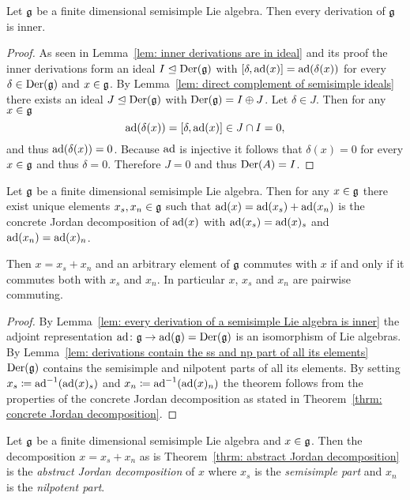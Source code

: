 \begin{lem}\label{lem: every derivation of a semisimple Lie algebra is inner}
 Let $\mathfrak{g}$ be a finite dimensional semisimple Lie algebra. Then every derivation of $\mathfrak{g}$ is inner.
\end{lem}
\begin{proof}
 As seen in Lemma~\ref{lem: inner derivations are in ideal} and its proof the inner derivations form an ideal $I \trianglelefteq \operatorname{Der}(\mathfrak{g})$ with $[\delta,\operatorname{ad}(x)] = \operatorname{ad}(\delta(x))$ for every $\delta \in \operatorname{Der}(\mathfrak{g})$ and $x \in \mathfrak{g}$. By Lemma~\ref{lem: direct complement of semisimple ideals} there exists an ideal $J \trianglelefteq \operatorname{Der}(\mathfrak{g})$ with $\operatorname{Der}(\mathfrak{g}) = I \oplus J$. Let $\delta \in J$. Then for any $x \in \mathfrak{g}$
 \[
  \operatorname{ad}(\delta(x)) = [\delta, \operatorname{ad}(x)] \in J \cap I = 0,
 \]
 and thus $\operatorname{ad}(\delta(x)) = 0$. Because $\operatorname{ad}$ is injective it follows that $\delta(x) = 0$ for every $x \in \mathfrak{g}$ and thus $\delta = 0$. Therefore $J = 0$ and thus $\operatorname{Der}(A) = I$.
\end{proof}


\begin{thrm} \label{thrm: abstract Jordan decomposition}
 Let $\mathfrak{g}$ be a finite dimensional semisimple Lie algebra. Then for any $x \in \mathfrak{g}$ there exist unique elements $x_s, x_n \in \mathfrak{g}$ such that $\operatorname{ad}(x) = \operatorname{ad}(x_s) + \operatorname{ad}(x_n)$ is the concrete Jordan decomposition of $\operatorname{ad}(x)$ with $\operatorname{ad}(x_s) = \operatorname{ad}(x)_s$ and $\operatorname{ad}(x_n) = \operatorname{ad}(x)_n$.
 
 Then $x = x_s + x_n$ and an arbitrary element of $\mathfrak{g}$ commutes with $x$ if and only if it commutes both with $x_s$ and $x_n$. In particular $x$, $x_s$ and $x_n$ are pairwise commuting.
\end{thrm}
\begin{proof}
 By Lemma~\ref{lem: every derivation of a semisimple Lie algebra is inner} the adjoint representation $\operatorname{ad} \colon \mathfrak{g} \to \operatorname{ad}(\mathfrak{g}) = \operatorname{Der}(\mathfrak{g})$ is an isomorphism of Lie algebras. By Lemma~\ref{lem: derivations contain the ss and np part of all its elements} $\operatorname{Der}(\mathfrak{g})$ contains the semisimple and nilpotent parts of all its elements. By setting $x_s \coloneq \operatorname{ad}^{-1}(\operatorname{ad}(x)_s)$ and $x_n \coloneqq \operatorname{ad}^{-1}(\operatorname{ad}(x)_n)$ the theorem follows from the properties of the concrete Jordan decomposition as stated in Theorem~\ref{thrm: concrete Jordan decomposition}.
\end{proof}


\begin{defi}
 Let $\mathfrak{g}$ be a finite dimensional semisimple Lie algebra and $x \in \mathfrak{g}$. Then the decomposition $x = x_s + x_n$ as is Theorem~\ref{thrm: abstract Jordan decomposition} is the \emph{abstract Jordan decomposition} of $x$ where $x_s$ is the \emph{semisimple part} and $x_n$ is the \emph{nilpotent part}.
\end{defi}












